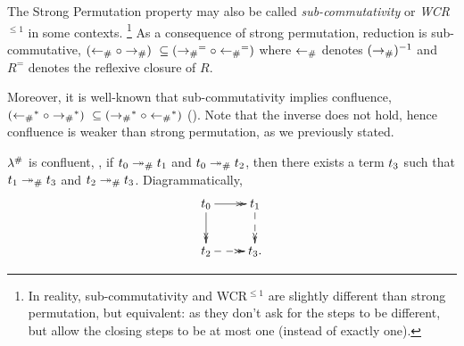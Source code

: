 \bigskip


The Strong Permutation property may also be called \emph{sub-commutativity}
or \emph{WCR$^{\leq 1}$} in some contexts.
\footnote{In reality, sub-commutativity and WCR$^{\leq 1}$ are slightly different
than strong permutation,
but equivalent:
as they don't ask for the steps to be different,
but allow the closing steps to be at most one (instead of exactly one).}
As a consequence of strong permutation, reduction is sub-commutative,
\ie $(\mathrel{\leftarrow_{\mathtt{\#}}} \circ \mathrel{\to_{\mathtt{\#}}})\ \subseteq (\mathrel{\to_{\mathtt{\#}}}^= \circ \mathrel{\leftarrow_{\mathtt{\#}}}^=)$
where
$\mathrel{\leftarrow_{\mathtt{\#}}}$ denotes $(\mathrel{\to_{\mathtt{\#}}})^{-1}$
and $R^=$ denotes the reflexive closure of $R$.

Moreover, it is well-known that sub-commutativity implies confluence,
\ie $(\mathrel{\leftarrow_{\mathtt{\#}}}^* \circ \mathrel{\to_{\mathtt{\#}}}^*)\ \subseteq (\mathrel{\to_{\mathtt{\#}}}^* \circ \mathrel{\leftarrow_{\mathtt{\#}}}^*)$
(\cf \cite[Proposition 1.1.10]{Terese}). Note that the
inverse does not hold, hence confluence is weaker than strong permutation, as we previously stated.

\begin{corollary}[Confluence]
$\lambda^{\mathtt{\#}}$ is confluent, \ie,
if $t_0 \mathrel{\mathrel{\twoheadrightarrow}_{\mathtt{\#}}} t_1$ and $t_0 \mathrel{\mathrel{\twoheadrightarrow}_{\mathtt{\#}}} t_2$, then there exists a term $t_3$
such that $t_1 \mathrel{\mathrel{\twoheadrightarrow}_{\mathtt{\#}}} t_3$ and $t_2 \mathrel{\mathrel{\twoheadrightarrow}_{\mathtt{\#}}} t_3$.
Diagrammatically,
\[
    \xymatrix{
      \tm_0 \ar@{->>}[d]
            \ar@{->>}[r] &
      \tm_1 \ar@{-->>}[d] \\
            \ar@{-->>}[r]
      \tm_2 &
      \tm_3. \\
    }
\]
\end{corollary}


